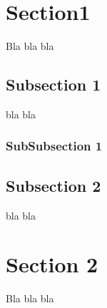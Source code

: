 \documentclass{article}
\begin{document}
\pagebreak


\pagebreak

\section{Section1}
Bla bla bla 
\subsection{Subsection 1}
bla bla
\subsubsection{SubSubsection 1}

\subsection{Subsection 2}
bla bla

\section{Section 2}
Bla bla bla \cite{CountdownTimer}








\end{document}
